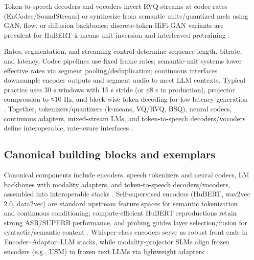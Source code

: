 Token-to-speech decoders and vocoders invert RVQ streams at codec rates (EnCodec/SoundStream) or synthesize from semantic units/quantized mels using GAN, flow, or diffusion backbones; discrete-token HiFi-GAN variants are prevalent for HuBERT-k-means unit inversion and interleaved pretraining \cite{wang2025tadicodectextawarediffusionspeechtokeniz,zeng2024scalingspeechtextpretrainingsyntheticint}.

Rates, segmentation, and streaming control determine sequence length, bitrate, and latency. Codec pipelines use fixed frame rates; semantic-unit systems lower effective rates via segment pooling/deduplication; continuous interfaces downsample encoder outputs and segment audio to meet LLM contexts. Typical practice uses 30 s windows with 15 s stride (or ≤8 s in production), projector compression to ≈10 Hz, and block-wise token decoding for low-latency generation \cite{nguyen2025qwenvsgemmaintegrationwhispercomparative,li2025seewossubmissionmlcslmlessonslearnedspee,zeng2024scalingspeechtextpretrainingsyntheticint}. Together, tokenizers/quantizers (k-means, VQ/RVQ, BSQ), neural codecs, continuous adapters, mixed-stream LMs, and token-to-speech decoders/vocoders define interoperable, rate-aware interfaces \cite{guo2025recentadvancesdiscretespeechtokensreview}.

\subsection{Canonical building blocks and exemplars} \label{subsec:Canonical building blocks and exemplars}
Canonical components include encoders, speech tokenizers and neural codecs, LM backbones with modality adapters, and token-to-speech decoders/vocoders, assembled into interoperable stacks \cite{guo2025recentadvancesdiscretespeechtokensreview}. Self-supervised encoders (HuBERT, wav2vec 2.0, data2vec) are standard upstream feature spaces for semantic tokenization and continuous conditioning; compute-efficient HuBERT reproductions retain strong ASR/SUPERB performance, and probing guides layer selection/fusion for syntactic/semantic content \cite{chen2023reducingbarriersselfsupervisedlearninghu,shen2023wavesyntaxprobingspokenlanguagemodels}. Whisper-class encoders serve as robust front ends in Encoder–Adaptor–LLM stacks, while modality-projector SLMs align frozen encoders (e.g., USM) to frozen text LLMs via lightweight adapters \cite{wang2023slmbridgethingapbetweenspeechtextfoundat,nguyen2025qwenvsgemmaintegrationwhispercomparative,guo2025recentadvancesdiscretespeechtokensreview}.

